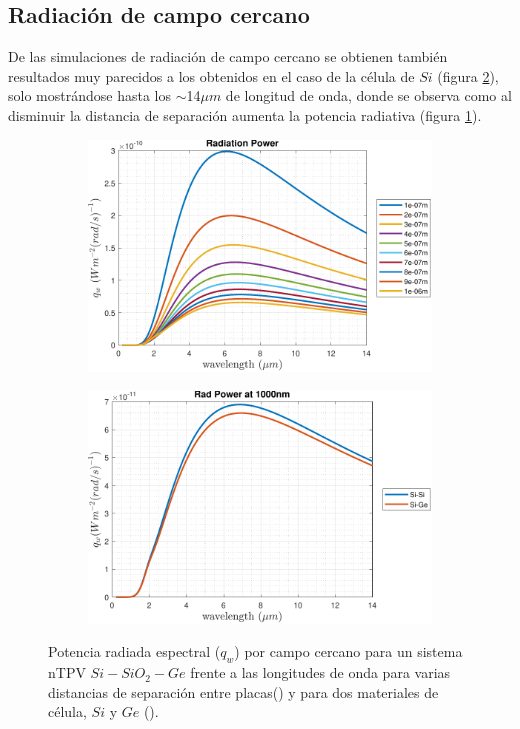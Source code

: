 \subsection{Radiación de campo cercano}
De las simulaciones de radiación de campo cercano se obtienen también resultados muy parecidos a los obtenidos en el caso de la célula de $Si$ (figura \ref{fig:SiSi_vs_SiGe}), solo mostrándose hasta los $\sim$14$\mu m$ de longitud de onda, donde se observa como al disminuir la distancia de separación aumenta la potencia radiativa (figura \ref{fig:rad_SiGe}).
\begin{figure}[H]
\centering
\begin{subfigure}[b]{0.49\textwidth}
	\centering
		\includegraphics[width=1.00\textwidth]{figuras/Resultados/radiacion/SiGe.pdf}
	\caption{ }
	\label{fig:rad_SiGe}
\end{subfigure}
\hfill
\begin{subfigure}[b]{0.49\textwidth}
	\centering
		\includegraphics[width=1.00\textwidth]{figuras/Resultados/radiacion/SiSi_vs_SiGe.pdf}
	\caption{ }
	\label{fig:SiSi_vs_SiGe}
\end{subfigure}
\caption{Potencia radiada espectral ($q_w$) por campo cercano para un sistema nTPV $Si-SiO_2-Ge$ frente a las longitudes de onda para varias distancias de separación entre placas() y para dos materiales de célula, $Si$ y $Ge$ ().}
\label{fig:rads_SiGe}
\end{figure}
